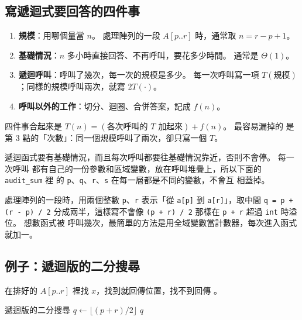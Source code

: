\subsection{寫遞迴式要回答的四件事}

\begin{enumerate}
\item \textbf{規模}：用哪個量當 $n$。 處理陣列的一段 $A[p..r]$ 時，通常取
$n = r - p + 1$。
\item \textbf{基礎情況}：$n$ 多小時直接回答、不再呼叫，要花多少時間。 通常是
$\Theta(1)$。
\item \textbf{遞迴呼叫}：呼叫了幾次，每一次的規模是多少。 每一次呼叫寫一項
$T(\text{規模})$；同樣的規模呼叫兩次，就寫 $2T(\cdot)$。
\item \textbf{呼叫以外的工作}：切分、迴圈、合併答案，記成 $f(n)$。
\end{enumerate}

四件事合起來是 $T(n) = (\text{各次呼叫的 } T \text{ 加起來}) + f(n)$。 最容易漏掉的
是第 3 點的「次數」：同一個規模呼叫了兩次，卻只寫一個 $T$。

\begin{cbookrecap}[第~15~章 15.2、15.4、15.6 節]
遞迴函式要有基礎情況，而且每次呼叫都要往基礎情況靠近，否則不會停。 每一次呼叫
都有自己的一份參數和區域變數，放在呼叫堆疊上，所以下面的 \texttt{audit\_sum} 裡
的 \texttt{p}、\texttt{q}、\texttt{r}、\texttt{s} 在每一層都是不同的變數，不會互
相蓋掉。

處理陣列的一段時，用兩個整數 \texttt{p}、\texttt{r} 表示「從 \texttt{a[p]} 到
\texttt{a[r]}」，取中間 \texttt{q = p + (r - p) / 2} 分成兩半，這樣寫不會像
\texttt{(p + r) / 2} 那樣在 \texttt{p + r} 超過 \texttt{int} 時溢位。 想數函式被
呼叫幾次，最簡單的方法是用全域變數當計數器，每次進入函式就加一。
\end{cbookrecap}

\subsection{例子：遞迴版的二分搜尋}

在排好的 $A[p..r]$ 裡找 $x$，找到就回傳位置，找不到回傳 \NIL。

\begin{pseudo}[label=alg:rec-search]{遞迴版的二分搜尋}
        \State \Return \NIL {}
    \EndIf
    \State $q \gets \lfloor (p + r) / 2 \rfloor$
        \State \Return $q$
        \State \Return {}
    \Else
        \State \Return {}
    \EndIf
\EndFunction
\end{pseudo}

